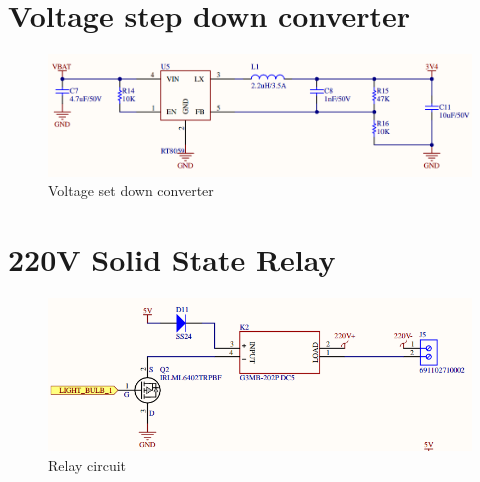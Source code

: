 \documentclass[\main/main.tex]{subfiles}
\begin{document}
\section{Voltage step down converter}
\begin{figure}[H]
    \begin{center}
        \includegraphics[scale=0.4]{voltage_set_down_converter.png}
    \end{center}
    \caption{Voltage set down converter}
    \label{fig:voltage_set_down_converter}
\end{figure}

\section{220V Solid State Relay}
\begin{figure}[H]
    \begin{center}
        \includegraphics[scale=0.4]{relay_circuit.png}
    \end{center}
    \caption{Relay circuit}
    \label{fig:relay_circuit}
\end{figure}
\end{document}
